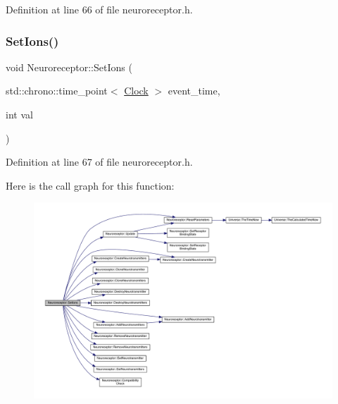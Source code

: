 Definition at line 66 of file neuroreceptor.\+h.

\mbox{\label{class_neuroreceptor_a36a548475e752631130a2b4ec67c66b6}} 
\subsubsection{\texorpdfstring{Set\+Ions()}{SetIons()}}
{\footnotesize\ttfamily void Neuroreceptor\+::\+Set\+Ions (\begin{DoxyParamCaption}\item[{std\+::chrono\+::time\+\_\+point$<$ \hyperlink{universe_8h_a0ef8d951d1ca5ab3cfaf7ab4c7a6fd80}{Clock} $>$}]{event\+\_\+time,  }\item[{int}]{val }\end{DoxyParamCaption})\hspace{0.3cm}{\ttfamily [inline]}}



Definition at line 67 of file neuroreceptor.\+h.

Here is the call graph for this function\+:
\nopagebreak
\begin{figure}[H]
\begin{center}
\leavevmode
\includegraphics[width=350pt]{class_neuroreceptor_a36a548475e752631130a2b4ec67c66b6_cgraph}
\end{center}
\end{figure}
\mbox{\label{class_neuroreceptor_a75adddd7e615af57b8f3f841ec25463c}} 

